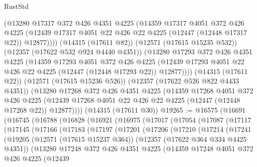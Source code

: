 \begin{lexlean}{RustStd}
\begin{coremodule}
          (@13280
            @17317
            @372
            @426
            @4351
            @4225
            (@14359
              @17317
              @4051
              @372
              @426
              @4225
              (@12439 @17317 @4051 @22 @426 @22 @4225 (@12447 (@12448 @17317 @22)) @12877))))
        (@14315 (@17611 @82))
        (@12571 (@17615 @15235 @532))
        (@12357 (@17622 @532 @924 @4440 @4351))
        (@13280
          @17293
          @372
          @426
          @4351
          @4225
          (@14359
            @17293
            @4051
            @372
            @426
            @4225
            (@12439 @17293 @4051 @22 @426 @22 @4225 (@12447 (@12448 @17293 @22)) @12877))))
      (@14315 (@17611 @22))
      (@12571 (@17615 @15236 @526))
      (@12357 (@17622 @526 @822 @4433 @4351))
      (@13280
        @17268
        @372
        @426
        @4351
        @4225
        (@14359
          @17268
          @4051
          @372
          @426
          @4225
          (@12439 @17268 @4051 @22 @426 @22 @4225 (@12447 (@12448 @17268 @22)) @12877))))
    (@14315 (@17611 @30))
@19265 := @16575
    (@16691
      (@16745
        (@16788
          (@16828
            (@16921
              (@16975
                (@17017
                  (@17054
                    (@17087
                      (@17117
                        (@17145
                          (@17166
                            (@17183
                              (@17197
                                (@17201
                                  (@17206
                                    (@17210
                                      (@17214
                                        (@17241
                                          (@19205
                                            (@12571 (@17615 @15237 @364))
                                            (@12357 (@17622 @364 @334 @4425 @4351))
                                            (@13280
                                              @17248
                                              @372
                                              @426
                                              @4351
                                              @4225
                                              (@14359
                                                @17248
                                                @4051
                                                @372
                                                @426
                                                @4225
                                                (@12439

\end{coremodule}
\end{lexlean}
